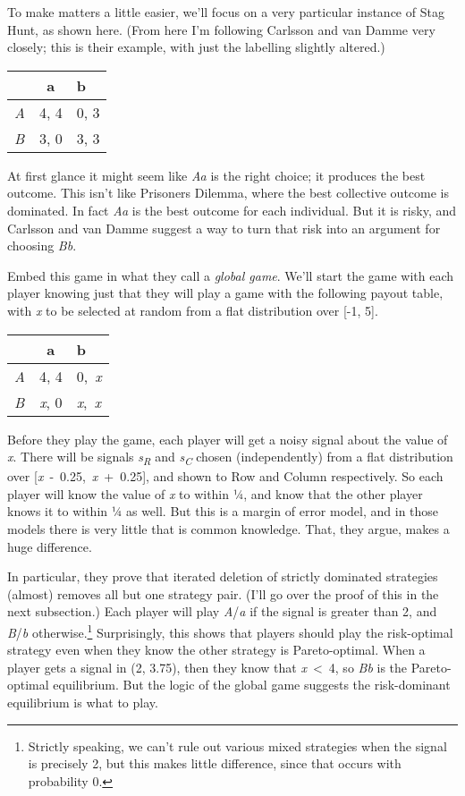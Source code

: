 \documentclass[
  11pt,
]{book}
\begin{document}
To make matters a little easier, we'll focus on a very particular instance of Stag Hunt, as shown here. (From here I'm following Carlsson and van Damme very closely; this is their example, with just the labelling slightly altered.)

\begin{longtable}[]{@{}lcl@{}}
\toprule()
& a & b \\
\midrule()
\endhead
\emph{A} & 4, 4 & 0, 3 \\
\emph{B} & 3, 0 & 3, 3 \\
\bottomrule()
\end{longtable}

At first glance it might seem like \emph{Aa} is the right choice; it produces the best outcome. This isn't like Prisoners Dilemma, where the best collective outcome is dominated. In fact \emph{Aa} is the best outcome for each individual. But it is risky, and Carlsson and van Damme suggest a way to turn that risk into an argument for choosing \emph{Bb}.

Embed this game in what they call a \emph{global game}. We'll start the game with each player knowing just that they will play a game with the following payout table, with \emph{x} to be selected at random from a flat distribution over {[}-1, 5{]}.

\begin{longtable}[]{@{}lcl@{}}
\toprule()
& a & b \\
\midrule()
\endhead
\emph{A} & 4, 4 & 0,~\emph{x} \\
\emph{B} & \emph{x}, 0 & \emph{x},~\emph{x} \\
\bottomrule()
\end{longtable}

Before they play the game, each player will get a noisy signal about the value of \emph{x}. There will be signals \emph{s\textsubscript{R}} and \emph{s\textsubscript{C}} chosen (independently) from a flat distribution over {[}\emph{x}~-~0.25,~\emph{x}~+~0.25{]}, and shown to Row and Column respectively. So each player will know the value of \emph{x} to within ¼, and know that the other player knows it to within ¼ as well. But this is a margin of error model, and in those models there is very little that is common knowledge. That, they argue, makes a huge difference.

In particular, they prove that iterated deletion of strictly dominated strategies (almost) removes all but one strategy pair. (I'll go over the proof of this in the next subsection.) Each player will play \emph{A}/\emph{a} if the signal is greater than 2, and \emph{B}/\emph{b} otherwise.\footnote{Strictly speaking, we can't rule out various mixed strategies when the signal is precisely 2, but this makes little difference, since that occurs with probability 0.} Surprisingly, this shows that players should play the risk-optimal strategy even when they know the other strategy is Pareto-optimal. When a player gets a signal in (2, 3.75), then they know that \emph{x}~\textless~4, so \emph{Bb} is the Pareto-optimal equilibrium. But the logic of the global game suggests the risk-dominant equilibrium is what to play.
\end{document}
